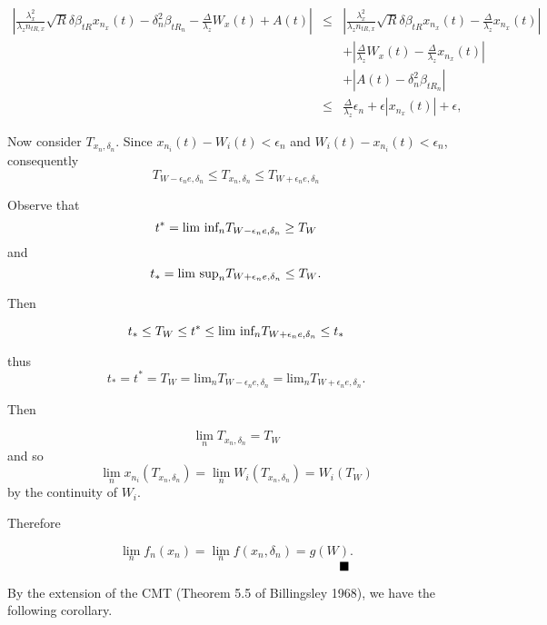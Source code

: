 \documentclass[11pt,english]{article}
\begin{document}
\begin{eqnarray*}
\left|\frac{\lambda_{x}^{2}}{\lambda_{z}n_{tR,x}}\sqrt{R}\delta\beta_{tR}x_{n_{x}}\left(t\right)-\delta_{n}^{2}\beta_{tR_{n}}-\frac{\Delta}{\lambda_{z}}W_{x}\left(t\right)+A\left(t\right)\right| & \leq & \left|\frac{\lambda_{x}^{2}}{\lambda_{z}n_{tR,x}}\sqrt{R}\delta\beta_{tR}x_{n_{x}}\left(t\right)-\frac{\Delta}{\lambda_{z}}x_{n_{x}}\left(t\right)\right|\\
 &  & +\left|\frac{\Delta}{\lambda_{z}}W_{x}\left(t\right)-\frac{\Delta}{\lambda_{z}}x_{n_{x}}\left(t\right)\right|\\
 &  & +\left|A\left(t\right)-\delta_{n}^{2}\beta_{tR_{n}}\right|\\
 & \leq & \frac{\Delta}{\lambda_{z}}\epsilon_{n}+\epsilon\left|x_{n_{x}}\left(t\right)\right|+\epsilon,
\end{eqnarray*}


Now consider $T_{x_{n},\delta_{n}}$. Since $x_{n_{i}}\left(t\right)-W_{i}\left(t\right)<\epsilon_{n}$
and $W_{i}\left(t\right)-x_{n_{i}}\left(t\right)<\epsilon_{n}$, consequently
\[
T_{W-\epsilon_{n}e,\delta_{n}}\leq T_{x_{n},\delta_{n}}\leq T_{W+\epsilon_{n}e,\delta_{n}}
\]


Observe that
\[
t^{*}=\text{\mbox{lim inf}}_{n}T_{W-\epsilon_{n}e,\delta_{n}}\geq T_{W}
\]
and
\[
t_{*}=\text{\mbox{lim sup}}_{n}T_{W+\epsilon_{n}e,\delta_{n}}\leq T_{W}.
\]


Then

\[
t_{*}\leq T_{W}\leq t^{*}\leq\text{\mbox{lim inf}}_{n}T_{W+\epsilon_{n}e,\delta_{n}}\leq t_{*}
\]


thus
\[
t_{*}=t^{*}=T_{W}=\mbox{lim}_{n}T_{W-\epsilon_{n}e,\delta_{n}}=\mbox{lim}_{n}T_{W+\epsilon_{n}e,\delta_{n}}.
\]


Then

\[
\lim_{n}T_{x_{n},\delta_{n}}=T_{W}
\]
and so
\[
\lim_{n}x_{n_{i}}\left(T_{x_{n},\delta_{n}}\right)=\lim_{n}W_{i}\left(T_{x_{n},\delta_{n}}\right)=W_{i}\left(T_{W}\right)
\]
by the continuity of $W_{i}$.
\[
\]


Therefore

\[
\lim_{n}f_{n}\left(x_{n}\right)=\lim_{n}f\left(x_{n},\delta_{n}\right)=g\left(W\right).
\]
$\;\;\;\;\;\;\;\;\;\;\;\;\;\;\;\;\;\;\;\;\;\;\;\;\;\;\;\;\;\;\;\;\;\;\;\;\;\;\;\;\;\;\;\;\;\;\;\;\;\;\;\;\;\;\;\;\;\;\;\;\;\;\;\;\;\;\;\;\;\;\;\;\;\;\;\;\;\;\;\;\;\;\;\;\;\;\;\;\;\;\;\;\;\;\text{\ensuremath{\blacksquare}}$

By the extension of the CMT (Theorem 5.5 of Billingsley 1968), we
have the following corollary.
\end{document}
